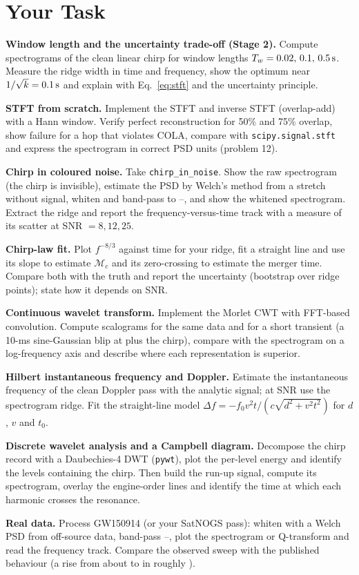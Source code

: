 \documentclass[11pt,a4paper]{article}
\begin{document}
\section*{Your Task}
\begin{tasks}
  \item \textbf{Window length and the uncertainty trade-off (Stage 2).} Compute spectrograms of the clean linear chirp for window lengths $T_w=0.02,\,0.1,\,\SI{0.5}{\second}$. Measure the ridge width in time and frequency, show the optimum near $1/\sqrt k=\SI{0.1}{\second}$ and explain with Eq.~\eqref{eq:stft} and the uncertainty principle.
  \item \textbf{STFT from scratch.} Implement the STFT and inverse STFT (overlap-add) with a Hann window. Verify perfect reconstruction for 50\% and 75\% overlap, show failure for a hop that violates COLA, compare with \texttt{scipy.signal.stft} and express the spectrogram in correct PSD units (problem 12).
  \item \textbf{Chirp in coloured noise.} Take \texttt{chirp\_in\_noise}. Show the raw spectrogram (the chirp is invisible), estimate the PSD by Welch's method from a stretch without signal, whiten and band-pass to --, and show the whitened spectrogram. Extract the ridge and report the frequency-versus-time track with a measure of its scatter at SNR $=8,12,25$.
  \item \textbf{Chirp-law fit.} Plot $f^{-8/3}$ against time for your ridge, fit a straight line and use its slope to estimate $\mathcal M_c$ and its zero-crossing to estimate the merger time. Compare both with the truth and report the uncertainty (bootstrap over ridge points); state how it depends on SNR.
  \item \textbf{Continuous wavelet transform.} Implement the Morlet CWT with FFT-based convolution. Compute scalograms for the same data and for a short transient (a 10-ms sine-Gaussian blip at  plus the chirp), compare with the spectrogram on a log-frequency axis and describe where each representation is superior.
  \item \textbf{Hilbert instantaneous frequency and Doppler.} Estimate the instantaneous frequency of the clean Doppler pass with the analytic signal; at  SNR use the spectrogram ridge. Fit the straight-line model $\Delta f=-f_0v^2t/(c\sqrt{d^2+v^2t^2})$ for $d$, $v$ and $t_0$.
  \item \textbf{Discrete wavelet analysis and a Campbell diagram.} Decompose the chirp record with a Daubechies-4 DWT (\texttt{pywt}), plot the per-level energy and identify the levels containing the chirp. Then build the run-up signal, compute its spectrogram, overlay the engine-order lines and identify the time at which each harmonic crosses the  resonance.
  \item \textbf{Real data.} Process GW150914 (or your SatNOGS pass): whiten with a Welch PSD from off-source data, band-pass --, plot the spectrogram or Q-transform and read the frequency track. Compare the observed sweep with the published behaviour (a rise from about  to  in roughly ).
\end{tasks}
\end{document}
